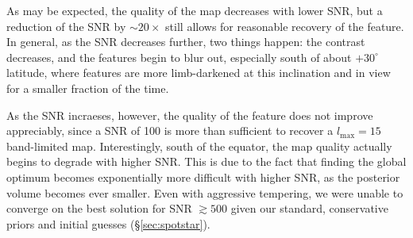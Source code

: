 \documentclass[modern]{aastex631}
\begin{document}
As may be expected, the quality of the map decreases with lower SNR, but a reduction of the SNR by $\sim 20\times$ still allows for reasonable recovery of the \spot feature. 
In general, as the SNR decreases further, two things happen: the \spot contrast decreases, and the features begin to blur out, especially south of about $+30^\circ$ latitude, where features are more limb-darkened at this inclination and in view for a smaller fraction of the time.

As the SNR incraeses, however, the quality of the \spot feature does not improve appreciably, since a SNR of 100 is more than sufficient to recover a $l_\mathrm{max} = 15$ band-limited map. 
Interestingly, south of the equator, the map quality actually begins to degrade with higher SNR. 
This is due to the fact that finding the global optimum becomes exponentially more difficult with higher SNR, as the posterior volume becomes ever smaller. 
Even with aggressive tempering, we were unable to converge on the best solution for SNR $\gtrsim 500$ given our standard, conservative priors and initial guesses (\S\ref{sec:spotstar}).
%
\end{document}
